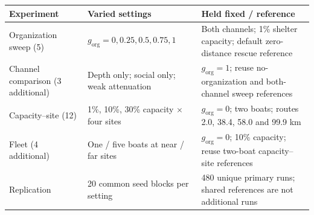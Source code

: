\begin{tabular}{@{}p{.24\linewidth}p{.32\linewidth}p{.36\linewidth}@{}}
\toprule
Experiment & Varied settings & Held fixed / reference \\
\midrule
Organization sweep (5) & $g_{\mathrm{org}}=0,0.25,0.5,0.75,1$ & Both channels; 1\% shelter capacity; default zero-distance rescue reference \\
Channel comparison (3 additional) & Depth only; social only; weak attenuation & $g_{\mathrm{org}}=1$; reuse no-organization and both-channel sweep references \\
Capacity--site (12) & 1\%, 10\%, 30\% capacity $\times$ four sites & $g_{\mathrm{org}}=0$; two boats; routes 2.0, 38.4, 58.0 and 99.9 km \\
Fleet (4 additional) & One / five boats at near / far sites & $g_{\mathrm{org}}=0$; 10\% capacity; reuse two-boat capacity--site references \\
Replication & 20 common seed blocks per setting & 480 unique primary runs; shared references are not additional runs \\
\bottomrule
\end{tabular}
